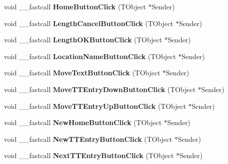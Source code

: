 \begin{DoxyCompactItemize}
void \+\_\+\+\_\+fastcall {\bfseries Home\+Button\+Click} (T\+Object $\ast$Sender)
\item 
\mbox{\label{class_t_interface_a5e7eff5bd235780252147bb4878a4c95}} 
void \+\_\+\+\_\+fastcall {\bfseries Length\+Cancel\+Button\+Click} (T\+Object $\ast$Sender)
\item 
\mbox{\label{class_t_interface_ab34f55bab5984b72264d7275660a3463}} 
void \+\_\+\+\_\+fastcall {\bfseries Length\+O\+K\+Button\+Click} (T\+Object $\ast$Sender)
\item 
\mbox{\label{class_t_interface_aef9267dd01da25269797e2e8ca08a3f9}} 
void \+\_\+\+\_\+fastcall {\bfseries Location\+Name\+Button\+Click} (T\+Object $\ast$Sender)
\item 
\mbox{\label{class_t_interface_af6e215dac581f32894a3216aa3d02ca2}} 
void \+\_\+\+\_\+fastcall {\bfseries Move\+Text\+Button\+Click} (T\+Object $\ast$Sender)
\item 
\mbox{\label{class_t_interface_a64926df4f293df9f038ce8c78e0201bb}} 
void \+\_\+\+\_\+fastcall {\bfseries Move\+T\+T\+Entry\+Down\+Button\+Click} (T\+Object $\ast$Sender)
\item 
\mbox{\label{class_t_interface_a768f6e8fb12c5a77b591e223ef10a46d}} 
void \+\_\+\+\_\+fastcall {\bfseries Move\+T\+T\+Entry\+Up\+Button\+Click} (T\+Object $\ast$Sender)
\item 
\mbox{\label{class_t_interface_a77c402ebf53d182c76821a44f5895d98}} 
void \+\_\+\+\_\+fastcall {\bfseries New\+Home\+Button\+Click} (T\+Object $\ast$Sender)
\item 
\mbox{\label{class_t_interface_a889fff98fb93d17aefc0a341a8216e72}} 
void \+\_\+\+\_\+fastcall {\bfseries New\+T\+T\+Entry\+Button\+Click} (T\+Object $\ast$Sender)
\item 
\mbox{\label{class_t_interface_a8d9fefd50730926d40c89801a70b8c95}} 
void \+\_\+\+\_\+fastcall {\bfseries Next\+T\+T\+Entry\+Button\+Click} (T\+Object $\ast$Sender)
\item 
\mbox{\label{class_t_interface_a12829827d073ae5056d81711947215d7}} 

\end{DoxyCompactItemize}
